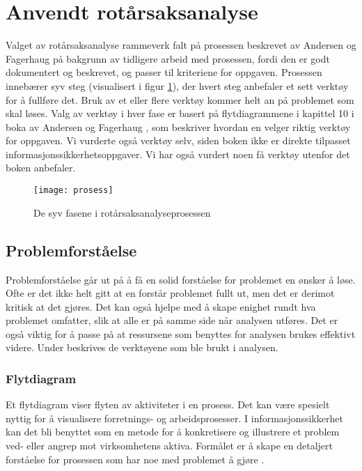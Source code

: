 \section{Anvendt rotårsaksanalyse}
Valget av rotårsaksanalyse rammeverk falt på prosessen beskrevet av Andersen og Fagerhaug på bakgrunn av tidligere arbeid med prosessen, fordi den er godt dokumentert og beskrevet, og passer til kriteriene for oppgaven. Prosessen innebærer syv steg (visualisert i figur \ref{fig:prosess}), der hvert steg anbefaler et sett verktøy for å fullføre det. Bruk av et eller flere verktøy kommer helt an på problemet som skal løses. Valg av verktøy i hver fase er basert på flytdiagrammene i kapittel 10 i boka av Andersen og Fagerhaug \cite{RCA}, som beskriver hvordan en velger riktig verktøy for oppgaven. Vi vurderte også verktøy selv, siden boken ikke er direkte tilpasset informasjonssikkerhetsoppgaver. Vi har også vurdert noen få verktøy utenfor det boken anbefaler. 

\begin{figure}[H]
    \centering
    \texttt{[image: prosess]}
    \caption[RCA-prosess]{De syv fasene i rotårsaksanalyseprosessen}
    \label{fig:prosess}
\end{figure}

\subsection{Problemforståelse}
Problemforståelse går ut på å få en solid forståelse for problemet en ønsker å løse. Ofte er det ikke helt gitt at en forstår problemet fullt ut, men det er derimot kritisk at det gjøres. Det kan også hjelpe med å skape enighet rundt hva problemet omfatter, slik at alle er på samme side når analysen utføres. Det er også viktig for å passe på at ressursene som benyttes for analysen brukes effektivt videre. Under beskrives de verktøyene som ble brukt i analysen. 

\subsubsection{Flytdiagram}
Et flytdiagram viser flyten av aktiviteter i en prosess. Det kan være spesielt nyttig for å visualisere forretnings- og arbeidsprosesser. I informasjonssikkerhet kan det bli benyttet som en metode for å konkretisere og illustrere et problem ved- eller angrep mot virksomhetens aktiva. Formålet er å skape en detaljert forståelse for prosessen som har noe med problemet å gjøre \cite{RCA}.

